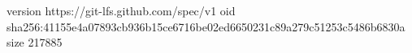 version https://git-lfs.github.com/spec/v1
oid sha256:41155e4a07893cb936b15ce6716be02ed6650231c89a279c51253c5486b6830a
size 217885
